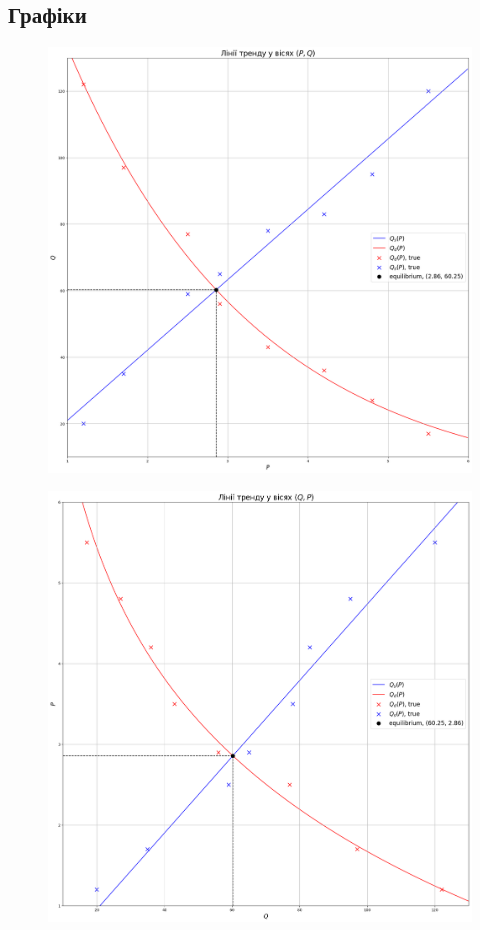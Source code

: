 \subsection{Графіки}

\begin{figure}[H]
	\centering
	\includegraphics[width=.9\textwidth]{p_q.png}
\end{figure}

\begin{figure}[H]
	\centering
	\includegraphics[width=.9\textwidth]{q_p.png}
\end{figure}

